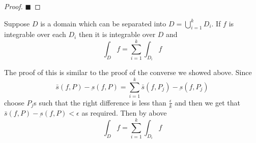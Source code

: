 \documentclass[10pt]{article}
\begin{document}
\begin{proof}
    \hfill$\blacksquare$

\end{proof}

\begin{prop*}

        Suppose $D$ is a domain which can be separated into $D=\bigcup_{i=1}^k D_i$.
        If $f$ is integrable over each $D_i$ then it is integrable over $D$ and
        \[ \int_Df = \sum_{i=1}^k\int_{D_i}f \]

\end{prop*}

The proof of this is similar to the proof of the converse we showed above.
Since
\[ \bar s(f,P) - \underbar s(f,P) = \sum_{i=1}^k \bar s(f,P_j) - \underbar s(f,P_j) \]
choose $P_j$s such that the right difference is less than $\frac\epsilon k$ and then we get that $\bar s(f,P)-\underbar s(f,P)<\epsilon$ as required.
Then by above
\[ \int_Df = \sum_{i=1}^k\int_{D_i}f \]
\end{document}
